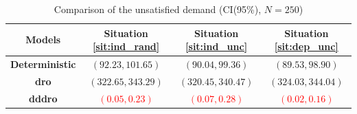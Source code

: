 \documentclass[12pt, letterpaper]{article}
\begin{document}
	\begin{table}
		\centering
		\caption{Comparison of the unsatisfied demand (CI(95\%), $N = 250$)}
		\label{tab:unsatisfied_demand_comparison}
		\begin{tabular}{c c c c}
			\toprule
			\textbf{Models} & \textbf{Situation \ref{sit:ind_rand}} & \textbf{Situation \ref{sit:ind_unc}} & \textbf{Situation \ref{sit:dep_unc}} \\
			\midrule
			\textbf{Deterministic} & $(92.23, 101.65)$ & $(90.04, 99.36)$ & $(89.53, 98.90)$ \\
			\textbf{\gls{dro}} & $(322.65, 343.29)$ & $(320.45, 340.47)$ & $(324.03, 344.04)$ \\
			\textbf{\gls{dddro}} & \textcolor{red}{$(0.05, 0.23)$} & \textcolor{red}{$(0.07, 0.28)$} & \textcolor{red}{$(0.02, 0.16)$} \\
			\bottomrule
		\end{tabular}
	\end{table}
	
\end{document}
